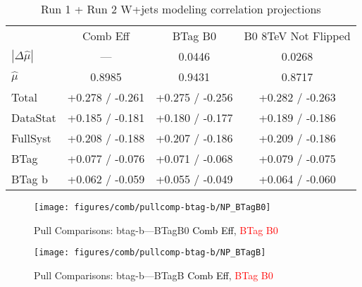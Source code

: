 \begin{table}[!htbp]\captionsetup{justification=centering}
\caption{Run 1 + Run 2 W+jets modeling correlation projections}
\begin{center}\begin{tabular}{lccc}
\hline\hline
 &Comb Eff &BTag B0 &B0 8TeV Not Flipped\\
$\left|\Delta\hat{\mu}\right|$ & --- & 0.0446 & 0.0268\\
$\hat{\mu}$ & 0.8985 & 0.9431 & 0.8717\\
\hline
Total &  +0.278 / -0.261  &  +0.275 / -0.256  &  +0.282 / -0.263 \\
DataStat &  +0.185 / -0.181  &  +0.180 / -0.177  &  +0.189 / -0.186 \\
FullSyst &  +0.208 / -0.188  &  +0.207 / -0.186  &  +0.209 / -0.186 \\
\hline
BTag &  +0.077 / -0.076  &  +0.071 / -0.068  &  +0.079 / -0.075 \\
BTag b &  +0.062 / -0.059  &  +0.055 / -0.049  &  +0.064 / -0.060 \\
\hline
\hline
\end{tabular}
\label{tab:Breakdowns:btag-b}
\end{center}\end{table}


\begin{figure}[!htbp]\captionsetup{justification=centering}
\centering\texttt{[image: figures/comb/pullcomp-btag-b/NP\_BTagB0]}
  \caption{Pull Comparisons: btag-b---BTagB0  \textcolor{black}{Comb Eff}, \textcolor{red}{BTag B0}}
  \label{fig:PullComparisons:btag-b---BTagB0}
\end{figure}

\begin{figure}[!htbp]\captionsetup{justification=centering}
\centering\texttt{[image: figures/comb/pullcomp-btag-b/NP\_BTagB]}
  \caption{Pull Comparisons: btag-b---BTagB  \textcolor{black}{Comb Eff}, \textcolor{red}{BTag B0}}
  \label{fig:PullComparisons:btag-b---BTagB}
\end{figure}

